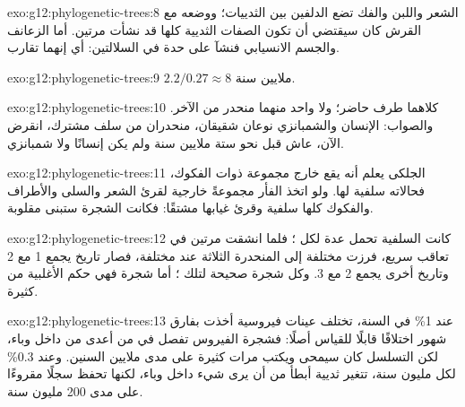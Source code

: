 \begin{solution}{exo:g12:phylogenetic-trees:8}
الشعر واللبن والفك تضع الدلفين بين الثدييات؛ ووضعه مع القرش كان
سيقتضي أن تكون الصفات الثديية كلها قد نشأت مرتين. أما الزعانف والجسم
الانسيابي فنشآ على حدة في السلالتين: أي إنهما تقارب.
\end{solution}

\begin{solution}{exo:g12:phylogenetic-trees:9}
$2.2/0.27 \approx 8$ ملايين سنة.
\end{solution}

\begin{solution}{exo:g12:phylogenetic-trees:10}
كلاهما طرف حاضر؛ ولا واحد منهما منحدر من الآخر. والصواب: الإنسان
والشمبانزي نوعان شقيقان، منحدران من سلف مشترك، انقرض الآن، عاش قبل
نحو ستة ملايين سنة ولم يكن إنسانًا ولا شمبانزي.
\end{solution}

\begin{solution}{exo:g12:phylogenetic-trees:11}
الجلكى يعلم أنه يقع خارج مجموعة  ذوات الفكوك، فحالاته سلفية
لها. ولو اتخذ الفأر مجموعةً خارجية لقرئ الشعر والسلى والأطراف والفكوك
كلها سلفية وقرئ غيابها مشتقًا: فكانت الشجرة ستبنى مقلوبة.
\end{solution}

\begin{solution}{exo:g12:phylogenetic-trees:12}
كانت  السلفية تحمل عدة  لكل ؛ فلما انشقت مرتين في
تعاقب سريع، فرزت  مختلفة إلى  المنحدرة الثلاثة عند
 مختلفة، فصار تاريخ  يجمع  1 مع  2 وتاريخ أخرى
يجمع 2 مع 3. وكل شجرة  صحيحة لتلك ؛ أما شجرة 
فهي حكم الأغلبية من  كثيرة.
\end{solution}

\begin{solution}{exo:g12:phylogenetic-trees:13}
عند 1\% في السنة، تختلف عينات فيروسية أخذت بفارق شهور اختلافًا قابلًا
للقياس أصلًا: فشجرة الفيروس تفصل في من أعدى من داخل وباء، لكن التسلسل
كان سيمحى ويكتب مرات كثيرة على مدى ملايين السنين. وعند 0.3\% لكل مليون
سنة، تتغير  ثديية أبطأ من أن يرى شيء داخل وباء، لكنها تحفظ سجلًا
مقروءًا على مدى 200 مليون سنة.
\end{solution}

